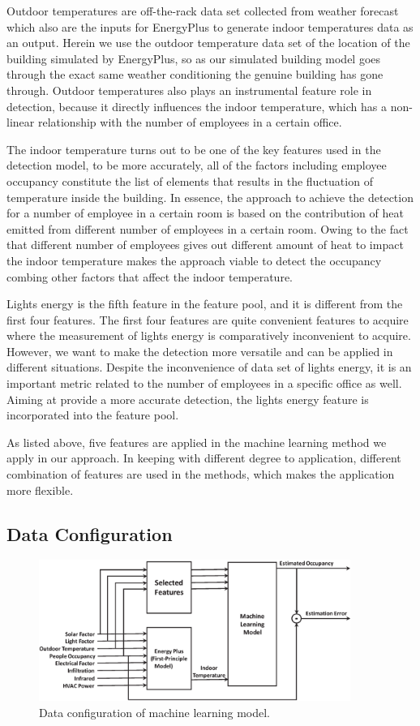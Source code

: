 Outdoor temperatures are off-the-rack data set collected from weather
forecast which also are the inputs for EnergyPlus to generate indoor
temperatures data as an output. Herein we use the outdoor
temperature data set of the location of the building simulated by EnergyPlus, so as
our simulated building model goes through the exact same weather
conditioning the genuine building has gone through. Outdoor
temperatures also plays an instrumental feature role in detection,
because it directly influences the indoor temperature, which has a
non-linear relationship with the number of employees in a certain
office.

The indoor temperature turns out to be one of the key features used in
the detection model, to be more accurately, all of the factors
including employee occupancy constitute the list of elements that
results in the fluctuation of temperature inside the building. In
essence, the approach to achieve the detection for a number of
employee in a certain room is based on the contribution of heat
emitted from different number of employees in a certain room. Owing to
the fact that different number of employees gives out different amount
of heat to impact the indoor temperature makes the approach viable to
detect the occupancy combing other factors that affect the indoor
temperature.

Lights energy is the fifth feature in the feature pool, and it is
different from the first four features. The first four features are quite
convenient features to acquire where the measurement of lights energy
is comparatively inconvenient to acquire. However, we want to make the
detection more versatile and can be applied in different situations.
Despite the inconvenience of data set of lights energy, it is an
important metric related to the number of employees in a specific office
as well. Aiming at provide a more accurate detection, the lights
energy feature is incorporated into the feature pool.

As listed above, five features are applied in the machine learning
method we apply in our approach. In keeping with different degree to
application, different combination of features are used in the
methods, which makes the application more flexible.

\subsection{Data Configuration}
\begin{figure}[!h]
\centering
\includegraphics[width=4in]{./Pics/FlowDiagram2.eps}
\caption{Data configuration of machine learning model.}
\label{fig:SVRFlow}
\end{figure}


